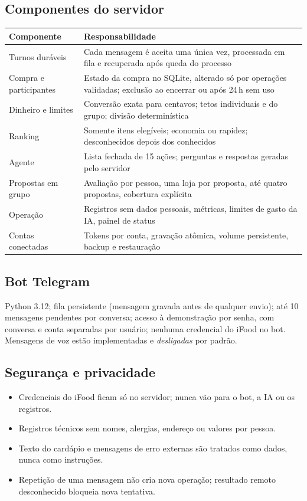 \documentclass[11pt,a4paper]{article}
\begin{document}
\subsection*{Componentes do servidor}
\begin{center}
\small
\begin{tabularx}{\linewidth}{lY}
\toprule
\textbf{Componente} & \textbf{Responsabilidade} \\
\midrule
Turnos duráveis & Cada mensagem é aceita uma única vez, processada em fila e recuperada após queda do processo \\
Compra e participantes & Estado da compra no SQLite, alterado só por operações validadas; exclusão ao encerrar ou após 24\,h sem uso \\
Dinheiro e limites & Conversão exata para centavos; tetos individuais e do grupo; divisão determinística \\
Ranking & Somente itens elegíveis; economia ou rapidez; desconhecidos depois dos conhecidos \\
Agente & Lista fechada de 15 ações; perguntas e respostas geradas pelo servidor \\
Propostas em grupo & Avaliação por pessoa, uma loja por proposta, até quatro propostas, cobertura explícita \\
Operação & Registros sem dados pessoais, métricas, limites de gasto da IA, painel de status \\
Contas conectadas & Tokens por conta, gravação atômica, volume persistente, backup e restauração \\
\bottomrule
\end{tabularx}
\end{center}

\subsection*{Bot Telegram}
Python 3.12; fila persistente (mensagem gravada antes de qualquer envio); até 10 mensagens pendentes por conversa; acesso à demonstração por senha, com conversa e conta separadas por usuário; nenhuma credencial do iFood no bot. Mensagens de voz estão implementadas e \emph{desligadas} por padrão.

\subsection*{Segurança e privacidade}
\begin{itemize}
  \item Credenciais do iFood ficam só no servidor; nunca vão para o bot, a IA ou os registros.
  \item Registros técnicos sem nomes, alergias, endereço ou valores por pessoa.
  \item Texto do cardápio e mensagens de erro externas são tratados como dados, nunca como instruções.
  \item Repetição de uma mensagem não cria nova operação; resultado remoto desconhecido bloqueia nova tentativa.
\end{itemize}
\end{document}
